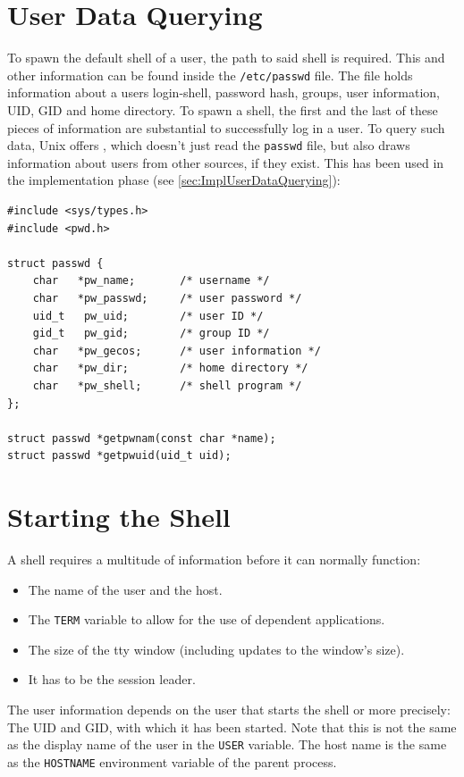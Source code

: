 \documentclass[10pt,a4paper,titlepage,twoside,english,final]{zhawreprt}
\begin{document}
\section{User Data Querying}\label{sec:DesignUserDataQuerying}
To spawn the default \gls{shell} of a user, the path to said \gls{shell} is required.
This and other information can be found inside the \texttt{/etc/passwd} file.
The file holds information about a users \gls{login}-\gls{shell}, password hash, groups, user information, \gls{UID}, \gls{GID} and home directory.
To spawn a \gls{shell}, the first and the last of these pieces of information are substantial to successfully log in a user.
To query such data, \gls{Unix} offers \cite{getpw}, which doesn't just read the \texttt{passwd} file, but also draws information about users from other sources, if they exist.
This has been used in the implementation phase (see \ref{sec:ImplUserDataQuerying}):
\setlistingC
\begin{lstlisting}[caption={Definition of passwd and {\cite{getpw}}},label=lst:PasswdDefinition]
#include <sys/types.h>
#include <pwd.h>

struct passwd {
	char   *pw_name;       /* username */
	char   *pw_passwd;     /* user password */
	uid_t   pw_uid;        /* user ID */
	gid_t   pw_gid;        /* group ID */
	char   *pw_gecos;      /* user information */
	char   *pw_dir;        /* home directory */
	char   *pw_shell;      /* shell program */
};

struct passwd *getpwnam(const char *name);
struct passwd *getpwuid(uid_t uid);
\end{lstlisting}


\section{Starting the Shell}\label{sec:DesignStartingTheShell}
A \gls{shell} requires a multitude of information before it can normally function:
\begin{itemize}
\item The name of the user and the host.
\item The \texttt{TERM} variable to allow for the use of \cite{ncurses} dependent applications.
\item The size of the \gls{tty} window (including updates to the window's size).
\item It has to be the session leader.
\end{itemize}

The user information depends on the user that starts the shell or more precisely:
The \gls{UID} and \gls{GID}, with which it has been started.
Note that this is not the same as the display name of the user in the \texttt{USER} variable.
The host name is the same as the \texttt{HOSTNAME} environment variable of the parent process.
\end{document}
